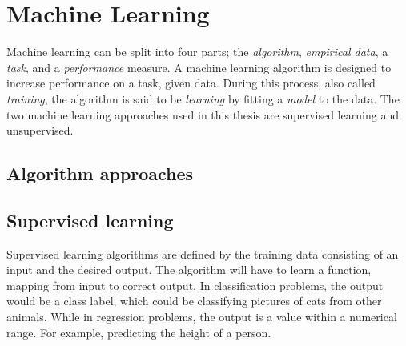 





\section{Machine Learning} \label{Machine Learning}
    Machine learning can be split into four parts; the \textit{algorithm}, \textit{empirical data}, a \textit{task}, and a \textit{performance} measure\cite{Goodfellow-et-al-2016}. A machine learning algorithm is designed to increase performance on a task, given data. During this process, also called \textit{training}, the algorithm is said to be \textit{learning} by fitting a \textit{model} to the data. The two machine learning approaches used in this thesis are supervised learning and unsupervised\cite{Goodfellow-et-al-2016}. 
    
    \subsection{Algorithm approaches} \label{Algorithm types}
        \subsection{Supervised learning}
            Supervised learning  algorithms are defined by the training data consisting of an input and the desired output\cite{Goodfellow-et-al-2016}. The algorithm will have to learn a function, mapping from input to correct output. In classification problems, the output would be a class label, which could be classifying pictures of cats from other animals. While in regression problems, the output is a value within a numerical range. For example, predicting the height of a person.
            
